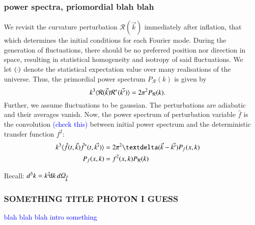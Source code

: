 



\sendhelp


\subsubsection{power spectra, priomordial blah blah}
    We revisit the curvature perturbation $\mathcal{R}(\vec{k})$ immediately after inflation, that which determines the initial conditions for each Fourier mode. During the generation of fluctuations, there should be no preferred position nor direction in space, resulting in statistical homogeneity and isotropy of said fluctuations. We let $\avg{\cdot}$ denote the statistical expectation value over many realisations of the universe. Thus, the primordial power spectrum $P_\mathcal{R}(k)$ is given by
    \begin{equation}
        k^3 \avg{\mathcal{R}(\vec{k})\mathcal{R}^*(\vec{k'})} = 2\pi^2P_\mathcal{R}(k).
    \end{equation}
    Further, we assume fluctuations to be gaussian. The perturbations are adiabatic and their averages vanish. Now, the power spectrum of perturbation variable $\hat{f}$ is the convolution \textcolor{blue}{(check this)} between initial power spectrum and the deterministic transfer function $f^2$:
    \begin{equation}
    \begin{split}
        k^3\avg{ \hat{f}(t,\vec{k}) \hat{f}^\ast (t,\vec{k'})} &= 2\pi^2 \deltafunc{\vec{k}-\vec{k'}} P_f (x,k) \\
        P_f(x,k) &= f^2(x,k) P_\mathcal{R}(k)
    \end{split}
    \end{equation}



    Recall: $d^3k = k^2 \dx{k} \dOmg[k]$


\subsubsection{SOMETHING TITLE PHOTON I GUESS}
\textcolor{blue}{blah blah blah intro something}


